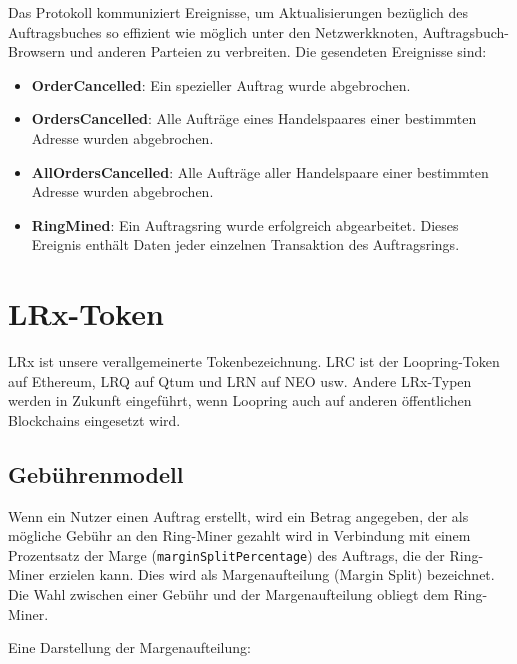 \documentclass[UTF8,nofonts]{article}
\makeatletter
\newenvironment{figurehere}
 {\def\@captype{figure}}
 {}
\makeatother
\begin{document}
\begin{multicols}{2}
Das Protokoll kommuniziert Ereignisse, um Aktualisierungen bezüglich des Auftragsbuches so effizient wie möglich unter den Netzwerkknoten, Auftragsbuch-Browsern und anderen Parteien zu verbreiten. Die gesendeten Ereignisse sind:

\begin{itemize}
	\item \textbf{OrderCancelled}: Ein spezieller Auftrag wurde abgebrochen.
	\item \textbf{OrdersCancelled}: Alle Aufträge eines Handelspaares einer bestimmten Adresse wurden abgebrochen.
	\item \textbf{AllOrdersCancelled}: Alle Aufträge aller Handelspaare einer bestimmten Adresse wurden abgebrochen.
	\item \textbf{RingMined}: Ein Auftragsring wurde erfolgreich abgearbeitet. Dieses Ereignis enthält Daten jeder einzelnen Transaktion des Auftragsrings.
\end{itemize}


\section{LRx-Token\label{sec:token}}
LRx ist unsere verallgemeinerte Tokenbezeichnung. LRC ist der Loopring-Token auf Ethereum, LRQ auf Qtum und LRN auf NEO usw. Andere LRx-Typen werden in Zukunft eingeführt, wenn Loopring auch auf anderen öffentlichen Blockchains eingesetzt wird.

\subsection{Gebührenmodell\label{sec:fee_model}} 
Wenn ein Nutzer einen Auftrag erstellt, wird ein Betrag angegeben, der als mögliche Gebühr an den Ring-Miner gezahlt wird in Verbindung mit einem Prozentsatz der Marge (\verb|marginSplitPercentage|) des Auftrags, die der Ring-Miner erzielen kann. Dies wird als Margenaufteilung (Margin Split) bezeichnet. Die Wahl zwischen einer Gebühr und der Margenaufteilung obliegt dem Ring-Miner.

Eine Darstellung der Margenaufteilung: 

\begin{center}
\begin{figurehere}
\centering
{}
\end{figurehere}
\end{center}
\end{multicols}
\end{document}

